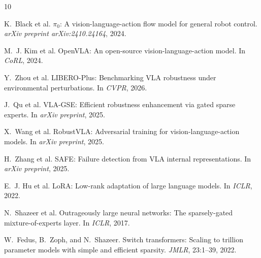 \documentclass[letterpaper]{article}
\begin{document}

\begin{thebibliography}{10}

K.~Black et al.
\newblock $\pi_0$: A vision-language-action flow model for general robot control.
\newblock \emph{arXiv preprint arXiv:2410.24164}, 2024.

M.~J. Kim et al.
\newblock OpenVLA: An open-source vision-language-action model.
\newblock In \emph{CoRL}, 2024.

Y.~Zhou et al.
\newblock LIBERO-Plus: Benchmarking VLA robustness under environmental perturbations.
\newblock In \emph{CVPR}, 2026.

J.~Qu et al.
\newblock VLA-GSE: Efficient robustness enhancement via gated sparse experts.
\newblock In \emph{arXiv preprint}, 2025.

X.~Wang et al.
\newblock RobustVLA: Adversarial training for vision-language-action models.
\newblock In \emph{arXiv preprint}, 2025.

H.~Zhang et al.
\newblock SAFE: Failure detection from VLA internal representations.
\newblock In \emph{arXiv preprint}, 2025.

E.~J. Hu et al.
\newblock LoRA: Low-rank adaptation of large language models.
\newblock In \emph{ICLR}, 2022.

N.~Shazeer et al.
\newblock Outrageously large neural networks: The sparsely-gated mixture-of-experts layer.
\newblock In \emph{ICLR}, 2017.

W.~Fedus, B.~Zoph, and N.~Shazeer.
\newblock Switch transformers: Scaling to trillion parameter models with simple and efficient sparsity.
\newblock \emph{JMLR}, 23:1--39, 2022.

\end{thebibliography}
\end{document}
